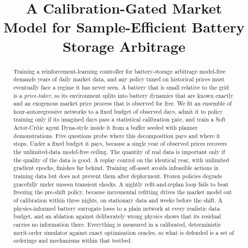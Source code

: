 \documentclass[conference]{IEEEtran}
\begin{document}
\makeatletter
\def\ps@IEEEtitlepagestyle{\ps@plain}
\makeatother
\pagestyle{plain}

\title{A Calibration-Gated Market Model for Sample-Efficient Battery Storage Arbitrage}

\author{
}

\maketitle

\begin{abstract}
Training a reinforcement-learning controller for battery-storage arbitrage model-free demands years of daily market data, and any policy tuned on historical prices must eventually face a regime it has never seen. A battery that is small relative to the grid is a \emph{price-taker}, so its environment splits into battery dynamics that are known exactly and an exogenous market price process that is observed for free. We fit an ensemble of hour-autoregressive networks to a fixed budget of observed days, admit it to policy training only if its imagined days pass a statistical calibration gate, and train a Soft Actor-Critic agent Dyna-style inside it from a buffer seeded with planner demonstrations. Five questions probe where this decomposition pays and where it stops. Under a fixed budget it pays, because a single year of observed prices recovers the unlimited-data model-free ceiling. The quantity of real data is important only if the quality of the data is good. A replay control on the identical year, with unlimited gradient epochs, finishes far behind. Training off-asset avoids infeasible actions in training data but does not prevent them after deployment. Frozen policies degrade gracefully under unseen transient shocks. A nightly refit-and-replan loop fails to beat freezing the pre-shift policy, because incremental refitting drives the market model out of calibration within three nights, on stationary data and weeks before the shift. A physics-informed battery surrogate loses to a plain network at every realistic data budget, and an ablation against deliberately wrong physics shows that its residual carries no information there. Everything is measured in a calibrated, deterministic merit-order simulator against exact optimisation oracles, so what is defended is a set of orderings and mechanisms within that testbed.
\end{abstract}
\end{document}

